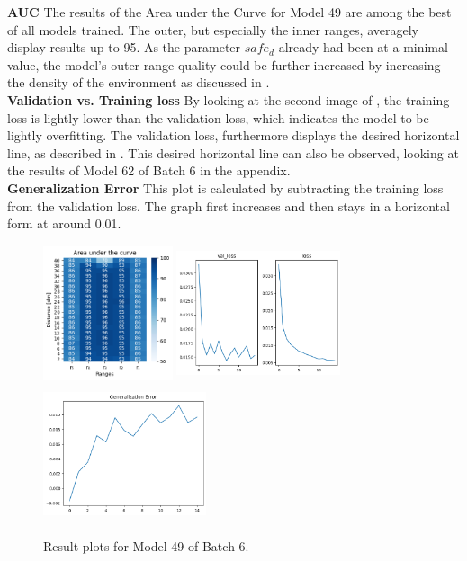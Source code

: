 \textbf{AUC} The results of the Area under the Curve for Model 49 are among the best of all models trained. The outer, but especially the inner ranges, averagely display results up to 95. As the parameter $safe_{d}$ already had been at a minimal value, the model's outer range quality could be further increased by increasing the density of the environment as discussed in .\\

\textbf{Validation vs. Training loss} By looking at the second image of , the training loss is lightly lower than the validation loss, which indicates the model to be lightly overfitting. The validation loss, furthermore displays the desired horizontal line, as described in \cite{DBLP:journals/corr/abs-1803-09820}. This desired horizontal line can also be observed, looking at the results of Model 62 of Batch 6 in the appendix.\\

\textbf{Generalization Error} This plot is calculated by subtracting the training loss from the validation loss. The graph first increases and then stays in a horizontal form at around 0.01.

\begin{figure}[H]%
\centering
\includegraphics[width=3.8cm, height=4cm]{4_plots/plots_49/AUC_49.png}
\hspace{0.2 cm}
\includegraphics[width=4.8cm, height=4cm]{3_models/models_49/graph_49.png}
\hspace{0.2 cm}
\includegraphics[width=4.8cm, height=4cm]{3_models/models_49/gen_loss_49.png}
\caption[]{Result plots for Model 49 of Batch 6.}
\label{best_model_49}
\end{figure}

